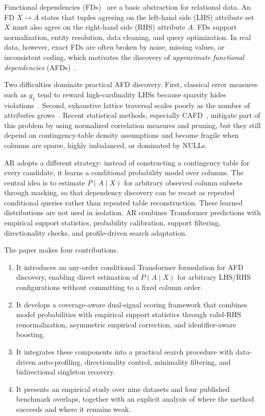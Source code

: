 \documentclass[conference]{IEEEtran}
\begin{document}
Functional dependencies (FDs)~\cite{tane,fastfd} are a basic abstraction for relational data. An FD $X \to A$ states that tuples agreeing on the left-hand side (LHS) attribute set $X$ must also agree on the right-hand side (RHS) attribute $A$. FDs support normalization, entity resolution, data cleaning, and query optimization. In real data, however, exact FDs are often broken by noise, missing values, or inconsistent coding, which motivates the discovery of \emph{approximate functional dependencies} (AFDs)~\cite{afd_survey,pyro,measure_study}.

Two difficulties dominate practical AFD discovery. First, classical error measures such as $g_1$ tend to reward high-cardinality LHSs because sparsity hides violations~\cite{g1_error,fdx}. Second, exhaustive lattice traversal scales poorly as the number of attributes grows~\cite{afd_survey}. Recent statistical methods, especially CAFD~\cite{cafdui}, mitigate part of this problem by using normalized correlation measures and pruning, but they still depend on contingency-table density assumptions and become fragile when columns are sparse, highly imbalanced, or dominated by NULLs.

AR adopts a different strategy: instead of constructing a contingency table for every candidate, it learns a conditional probability model over columns. The central idea is to estimate $P(A \mid X)$ for arbitrary observed column subsets through masking, so that dependency discovery can be recast as repeated conditional queries rather than repeated table reconstruction. These learned distributions are not used in isolation. AR combines Transformer predictions with empirical support statistics, probability calibration, support filtering, directionality checks, and profile-driven search adaptation.

The paper makes four contributions.
\begin{enumerate}
    \item It introduces an any-order conditional Transformer formulation for AFD discovery, enabling direct estimation of $P(A \mid X)$ for arbitrary LHS/RHS configurations without committing to a fixed column order.
    \item It develops a coverage-aware dual-signal scoring framework that combines model probabilities with empirical support statistics through valid-RHS renormalization, asymmetric empirical correction, and identifier-aware boosting.
    \item It integrates these components into a practical search procedure with data-driven auto-profiling, directionality control, minimality filtering, and bidirectional singleton recovery.
    \item It presents an empirical study over nine datasets and four published benchmark overlaps, together with an explicit analysis of where the method succeeds and where it remains weak.
\end{enumerate}
\end{document}
